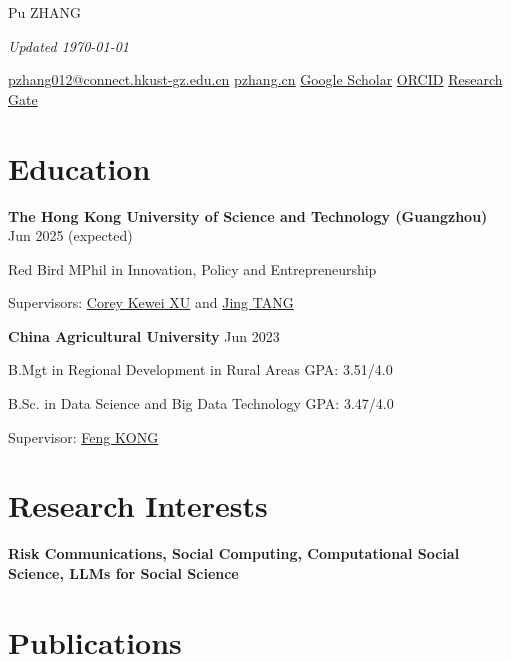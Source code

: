 \documentclass[letterpaper, 11pt]{article}
\newcommand{\sepspace}{\vspace{0.5em}}
\begin{document}
\setlength{\parindent}{0pt}

\begin{center}
    \Huge Pu ZHANG
\end{center}
\hfill{\it\footnotesize Updated \today}
\begin{center}

\href{mailto:pzhang012@connect.hkust-gz.edu.cn}{pzhang012@connect.hkust-gz.edu.cn}
\hspace{0.1in}\href{https://pzhang.cn}{pzhang.cn}
\hspace{0.1in}\href{https://scholar.google.com/citations?user=DBKpQPQAAAAJ}{Google Scholar}
\hspace{0.1in}\href{https://orcid.org/0000-0002-7501-2124}{ORCID}%
\hspace{0.1in}\href{https://www.researchgate.net/profile/Pu-Zhang-33/}{Research Gate}
\end{center}

\section{Education}

\textbf{The Hong Kong University of Science and Technology (Guangzhou)} \hfill Jun 2025 (expected)

Red Bird MPhil in Innovation, Policy and Entrepreneurship

Supervisors: \href{https://facultyprofiles.hkust-gz.edu.cn/faculty-personal-page/XU-Kewei/coreyxu}{Corey Kewei XU} and \href{https://facultyprofiles.hkust-gz.edu.cn/faculty-personal-page/TANG-Jing/jingtang}{Jing TANG} 

\sepspace
\textbf{China Agricultural University} \hfill Jun 2023

B.Mgt in Regional Development in Rural Areas \hfill GPA: 3.51/4.0

B.Sc. in Data Science and Big Data Technology \hfill GPA: 3.47/4.0

Supervisor: \href{https://cohd.cau.edu.cn/art/2020/11/27/art_48059_998984.html}{Feng KONG} 

\section{Research Interests}
\textbf{Risk Communications, Social Computing, Computational Social Science, LLMs for Social Science}

\section{Publications}
\end{document}
